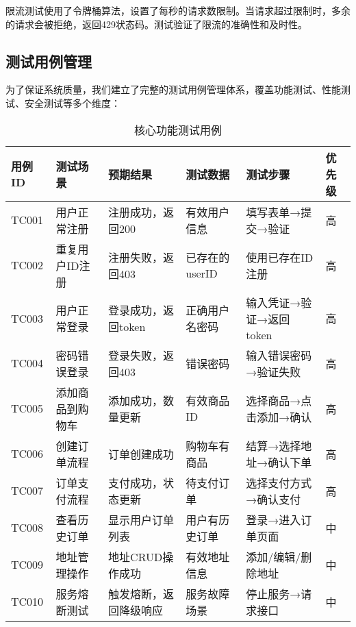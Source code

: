\documentclass[a4paper,12pt]{article}
\begin{document}
限流测试使用了令牌桶算法，设置了每秒的请求数限制。当请求超过限制时，多余的请求会被拒绝，返回429状态码。测试验证了限流的准确性和及时性。

\subsection{测试用例管理}

为了保证系统质量，我们建立了完整的测试用例管理体系，覆盖功能测试、性能测试、安全测试等多个维度：

\begin{table}[H]
\centering
\caption{核心功能测试用例}
\begin{tabular}{|p{1cm}|p{3cm}|p{3cm}|p{2.5cm}|p{2.5cm}|p{1.5cm}|}
\hline
\textbf{用例ID} & \textbf{测试场景} & \textbf{预期结果} & \textbf{测试数据} & \textbf{测试步骤} & \textbf{优先级} \\
\hline
TC001 & 用户正常注册 & 注册成功，返回200 & 有效用户信息 & 填写表单→提交→验证 & 高 \\
\hline
TC002 & 重复用户ID注册 & 注册失败，返回403 & 已存在的userID & 使用已存在ID注册 & 高 \\
\hline
TC003 & 用户正常登录 & 登录成功，返回token & 正确用户名密码 & 输入凭证→验证→返回token & 高 \\
\hline
TC004 & 密码错误登录 & 登录失败，返回403 & 错误密码 & 输入错误密码→验证失败 & 高 \\
\hline
TC005 & 添加商品到购物车 & 添加成功，数量更新 & 有效商品ID & 选择商品→点击添加→确认 & 高 \\
\hline
TC006 & 创建订单流程 & 订单创建成功 & 购物车有商品 & 结算→选择地址→确认下单 & 高 \\
\hline
TC007 & 订单支付流程 & 支付成功，状态更新 & 待支付订单 & 选择支付方式→确认支付 & 高 \\
\hline
TC008 & 查看历史订单 & 显示用户订单列表 & 用户有历史订单 & 登录→进入订单页面 & 中 \\
\hline
TC009 & 地址管理操作 & 地址CRUD操作成功 & 有效地址信息 & 添加/编辑/删除地址 & 中 \\
\hline
TC010 & 服务熔断测试 & 触发熔断，返回降级响应 & 服务故障场景 & 停止服务→请求接口 & 中 \\
\hline
\end{tabular}
\end{table}
\end{document}
